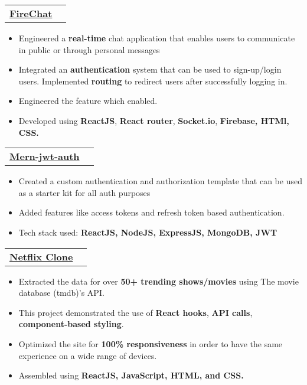 \documentclass[letterpaper,11pt]{article}
\makeatletter
\newcommand{\resumeItem}[1]{
  \item\small{
    {#1 \vspace{-2pt}}
  }
}
\newcommand{\resumeProjectHeading}[2]{
    \item
    \begin{tabular*}{1.001\textwidth}{l@{\extracolsep{\fill}}r}
      \small#1 & \textbf{\small #2}\\
    \end{tabular*}\vspace{-7pt}
}
\newcommand{\resumeItemListStart}{\begin{itemize}}
\newcommand{\resumeItemListEnd}{\end{itemize}\vspace{-5pt}}
\makeatother
\begin{document}
      \resumeProjectHeading
{\href{https://github.com/adarsh500/FireChat}{\textbf{FireChat \faExternalLink}} \emph{}}{\href{https://github.com/adarsh500/FireChatBack}{\faGithub }}
          \resumeItemListStart
            \resumeItem{Engineered a \textbf{real-time} chat application that enables users to communicate in public or through personal messages}
            \resumeItem{Integrated an \textbf{authentication} system that can be used to sign-up/login users. Implemented \textbf{routing} to redirect users after successfully logging in.}
            \resumeItem{Engineered the feature which enabled.}
            \resumeItem{Developed using \textbf{ReactJS}, \textbf{React router}, \textbf{Socket.io}, \textbf{Firebase, HTMl, CSS.}}
          \resumeItemListEnd
          \vspace{-13pt}

          \resumeProjectHeading
{\href{https://github.com/adarsh500/mern-auth-jwt}{\textbf{Mern-jwt-auth \faExternalLink}} \emph{}}{\href{https://github.com/adarsh500/mern-auth-jwt}{\faGithub }}
          \resumeItemListStart
            \resumeItem{Created a custom authentication and authorization template that can be used as a starter kit for all auth purposes}
            \resumeItem{Added features like access tokens and refresh token based authentication.}
            \resumeItem{Tech stack used:  \textbf{ReactJS, NodeJS, ExpressJS, MongoDB, JWT}}
          \resumeItemListEnd
          \vspace{-9pt}
          
      \resumeProjectHeading
{\href{https://netflix-clone1809.netlify.app}{\textbf{Netflix Clone \faExternalLink}} \emph{}}{\href{https://github.com/adarsh500/netflix_clone}{\faGithub}}
          \resumeItemListStart
            
            \resumeItem{Extracted the data for over \textbf{50+ trending shows/movies} using The movie database (tmdb)'s API.}
            \resumeItem{This project demonstrated the use of \textbf{React hooks}, \textbf{API calls}, \textbf{component-based styling}. }
            \resumeItem{Optimized the site for \textbf{100\% responsiveness} in order to have the same experience on a wide range of devices.}
            \resumeItem{Assembled using \textbf{ReactJS, JavaScript, HTML, and CSS.}}
          \resumeItemListEnd
          \vspace{-13pt}
          
          
          
          
\end{document}
